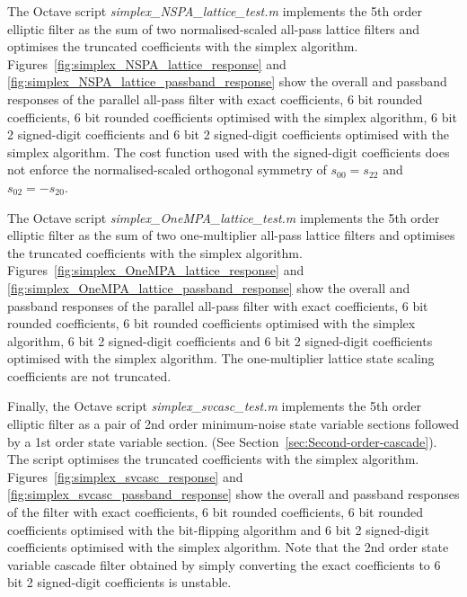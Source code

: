 \documentclass[a4paper,twoside,10pt,english]{report}
\begin{document}
The Octave script \emph{simplex\_NSPA\_lattice\_test.m} implements the 5th 
order elliptic filter as the sum of two normalised-scaled all-pass lattice
filters and optimises the truncated coefficients with the simplex algorithm. 
Figures~\ref{fig:simplex_NSPA_lattice_response} and 
\ref{fig:simplex_NSPA_lattice_passband_response} show the overall and passband
responses of the parallel all-pass filter with exact coefficients,
6 bit rounded coefficients, 6 bit rounded coefficients optimised with the 
simplex algorithm, 6 bit 2 signed-digit coefficients and 6 bit 2 signed-digit
coefficients optimised with the simplex algorithm. The cost 
function used with the signed-digit coefficients does not enforce the 
normalised-scaled orthogonal symmetry of $s_{00}=s_{22}$ and $s_{02}=-s_{20}$.

The Octave script \emph{simplex\_OneMPA\_lattice\_test.m}
implements the 5th order elliptic filter as the sum of two one-multiplier 
all-pass lattice filters and optimises the truncated coefficients with the 
simplex algorithm. Figures~\ref{fig:simplex_OneMPA_lattice_response} and 
\ref{fig:simplex_OneMPA_lattice_passband_response} show the overall and passband
responses of the parallel all-pass filter with exact coefficients, 6 bit rounded
coefficients, 6 bit rounded coefficients optimised with the simplex 
algorithm, 6 bit 2 signed-digit coefficients and 6 bit 2 signed-digit 
coefficients optimised with the simplex algorithm. The one-multiplier 
lattice state scaling coefficients are not truncated. 

Finally, the Octave script \emph{simplex\_svcasc\_test.m} implements the 5th
order elliptic filter as a pair of 2nd order minimum-noise state variable 
sections followed by a 1st order state variable section. (See 
Section~\ref{sec:Second-order-cascade}). The script optimises the truncated 
coefficients with the simplex algorithm. 
Figures~\ref{fig:simplex_svcasc_response} and 
\ref{fig:simplex_svcasc_passband_response} show the overall and passband
responses of the filter with exact coefficients, 6 bit rounded
coefficients, 6 bit rounded coefficients optimised with the bit-flipping 
algorithm and 6 bit 2 signed-digit coefficients optimised with the simplex 
algorithm. Note that the 2nd order state variable cascade filter obtained by 
simply converting the exact coefficients to 6 bit 2 signed-digit coefficients 
is unstable.
\end{document}
